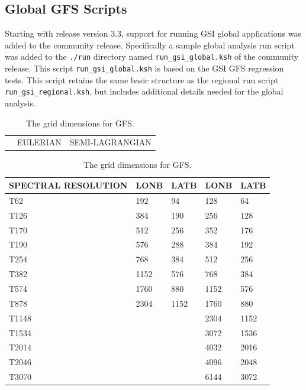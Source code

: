 \subsection{Global GFS Scripts}

Starting with release version 3.3, support for running GSI global applications was added to the community release. Specifically a sample global analysis 
run script was added to the \verb|./run| directory named \verb|run_gsi_global.ksh| of the community release. This script \verb|run_gsi_global.ksh| is 
based on the GSI GFS regression tests. This script retains the same basic structure as the regional run script \verb|run_gsi_regional.ksh|, but includes 
additional details needed for the global analysis. 

\begin{table}[htbp]
\centering
\caption{The grid dimensions for GFS.}
\begin{tabular}{|p{3cm}|p{4.5cm}|p{4.45cm}|}
\hline
&EULERIAN&SEMI-LAGRANGIAN\\
\end{tabular}
\begin{tabular}{|p{3cm}|p{2cm}|p{2cm}|p{2cm}|p{2cm}|}
\hline
SPECTRAL RESOLUTION &  LONB & LATB & LONB & LATB \\
\hline
T62&192&94&128&64\\
\hline
T126&384&190&256&128\\
\hline
T170&512&256&352&176\\
\hline
T190&576&288&384&192\\
\hline
T254&768&384&512&256\\
\hline
T382&1152&576&768&384\\
\hline
T574&1760&880&1152&576\\
\hline
T878&2304&1152&1760&880\\
\hline
T1148&&&2304&1152\\
\hline
T1534&&&3072&1536\\
\hline
T2014&&&4032&2016\\
\hline
T2046&&&4096&2048\\
\hline
T3070&&&6144&3072\\
\hline
\end{tabular}
\label{ch6_table1}
\end{table} 

